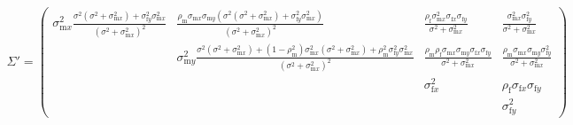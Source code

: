 \documentclass{article}
\newcommand{\x}[1]{\text{#1}}
\begin{document}
\begin{landscape}
\newpage{}

\begin{align*}
\Sigma'=\left(\begin{array}{cccc}\sigma_{\x{m}x}^2\frac{\sigma^2(\sigma^2+\sigma_{\x{m}x}^2)+\sigma_{\x{f}y}^2\sigma_{\x{m}x}^2}{(\sigma^2+\sigma_{\x{m}x}^2)^2} & \frac{\rho_\x{m}\sigma_{\x{m}x}\sigma_{\x{m}y}\left(\sigma^2(\sigma^2+\sigma_{\x{m}x}^2)+\sigma_{\x{f}y}^2\sigma_{\x{m}x}^2\right)}{(\sigma^2+\sigma_{\x{m}x}^2)^2} & \frac{\rho_{\x{f}}\sigma_{\x{m}x}^2\sigma_{\x{f}x}\sigma_{\x{f}y}}{\sigma^2+\sigma_{\x{m}x}^2} & \frac{\sigma_{\x{m}x}^2\sigma_{\x{f}y}^2}{\sigma^2+\sigma_{\x{m}x}^2} 
\\ & \sigma_{\x{m}y}^2\frac{\sigma^2(\sigma^2+\sigma_{\x{m}x}^2)+(1-\rho_\x{m}^2)\sigma_{\x{m}x}^2(\sigma^2+\sigma_{\x{m}x}^2)+\rho_\x{m}^2\sigma_{\x{f}y}^2\sigma_{\x{m}x}^2}{(\sigma^2+\sigma_{\x{m}x}^2)^2} & \frac{\rho_\x{m}\rho_\x{f}\sigma_{\x{m}x}\sigma_{\x{m}y}\sigma_{\x{f}x}\sigma_{\x{f}y}}{\sigma^2+\sigma_{\x{m}x}^2} & \frac{\rho_\x{m}\sigma_{\x{m}x}\sigma_{\x{m}y}\sigma_{\x{f}y}^2}{\sigma^2+\sigma_{\x{m}x}^2}
\\ & & \sigma_{\x{f}x}^2 & \rho_\x{f}\sigma_{\x{f}x}\sigma_{\x{f}y}
\\ & & & \sigma_{\x{f}y}^2
\end{array}\right)&
\end{align*}
\end{landscape} 
\end{document}
